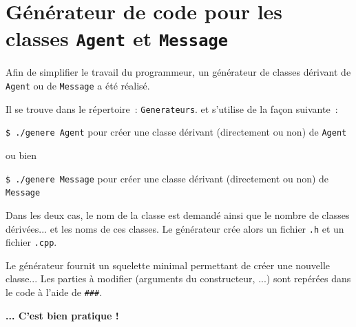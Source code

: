 \documentclass[12pt]{article}
\begin{document}
\section{G\'en\'erateur de code pour les classes {\tt Agent} et {\tt Message}}

\vspace{0.5cm}

Afin de simplifier le travail du programmeur, un g\'en\'erateur de classes
d\'erivant de {\tt Agent} ou de {\tt Message} a \'et\'e r\'ealis\'e.

\vspace{0.2cm}
Il se trouve dans le r\'epertoire~: {\tt Generateurs}.
et s'utilise de la fa\c con suivante~:

\vspace{0.2cm}
{\tt \$ ./genere Agent} pour cr\'eer une classe d\'erivant (directement
ou non) de {\tt Agent}

\vspace{0.2cm}
ou bien

\vspace{0.2cm}
{\tt \$ ./genere Message} pour cr\'eer une classe d\'erivant (directement
ou non) de {\tt Message}

\vspace{0.2cm}
Dans les deux cas, le nom de la classe est demand\'e ainsi que
le nombre de classes d\'eriv\'ees... et les noms de ces classes.
Le g\'en\'erateur cr\'ee alors un fichier {\tt .h} et un fichier {\tt .cpp}.

\vspace{0.2cm}
Le g\'en\'erateur fournit un squelette minimal permettant de cr\'eer
une nouvelle classe...
Les parties \`a modifier (arguments du constructeur, ...) sont rep\'er\'ees
dans le code \`a l'aide de {\tt \#\#\#}.

\vspace{0.5cm}
{\bf ... C'est bien pratique !}

\hspace{0.5cm}{\bf ... C'est bien pratique !}

\hspace{1cm}{\bf ... C'est bien pratique !}

\hspace{1.5cm}{\bf ... C'est bien pratique !}

\hspace{2cm}{\bf ... C'est bien pratique !}

\hspace{2.5cm}{\bf ... C'est bien pratique !}
\end{document}
